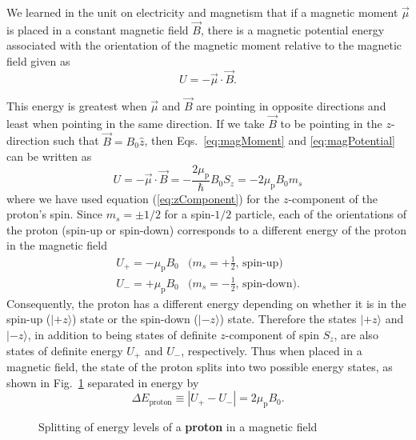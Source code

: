 We learned in the unit on electricity and magnetism that if a
magnetic moment $\vec{\mu}$ is placed in a constant magnetic field
$\vec{B}$, there is a magnetic potential energy associated with the
orientation of the magnetic moment relative to the magnetic field given as
\begin{equation}
U = - \vec{\mu} \cdot \vec{B} .
\label{eq:magPotential}
\end{equation}

This energy is greatest when $\vec{\mu}$ and $\vec{B}$ are pointing in
opposite directions and least when pointing in the same direction.  If we
take  $\vec{B}$ to be pointing in the $z$-direction such that $\vec{B} =
B_0 \hat{z}$, then Eqs.~\ref{eq:magMoment} and \ref{eq:magPotential}
can be written as
\begin{equation} U = - \vec{\mu} \cdot \vec{B} = - \frac{2 \mu_\text{p}}{\hbar}
B_0 S_z = - 2 \mu_\text{p} B_0 m_s \label{eq:magPotential2}\end{equation}
where we have used equation (\ref{eq:zComponent}) for the
$z$-component of the proton's spin.  Since $m_s = \pm 1 / 2$ for a
spin-$1/2$ particle, each of the orientations of the proton (spin-up
or spin-down) corresponds to a different energy of the proton in the
magnetic field
\begin{eqnarray}
  U_+ = -  \mu_\text{p} B_0 & \mbox{$(m_s = +\frac{1}{2}$, spin-up)} \\
  U_- = +  \mu_\text{p} B_0 & \mbox{$(m_s = -\frac{1}{2}$, spin-down)} .
\end{eqnarray}
Consequently, the proton has a different energy depending
on whether it is in the spin-up ($|\mbox{$+z$}\rangle$) state or
the spin-down ($|\mbox{$-z$}\rangle$) state.  Therefore the states
$|\mbox{$+z$}\rangle$ and $|\mbox{$-z$}\rangle$, in addition to being
states of definite $z$-component of spin $S_z$, are also states of
definite energy $U_+$ and $U_-$, respectively. Thus when placed in a
magnetic field, the state of the proton splits into two possible energy
states, as shown in Fig.~\ref{fig:levelsplitting} separated in energy by
\begin{equation}
\label{eq:deltaE}
\Delta E_\text{proton} \equiv |U_+ - U_-| =  2\mu_\text{p} B_0 .
\end{equation}

\begin{figure}
\begin{center}
\caption{Splitting of energy levels of a {\bf proton} in a magnetic field}
\label{fig:levelsplitting}
\end{center}
\end{figure}

